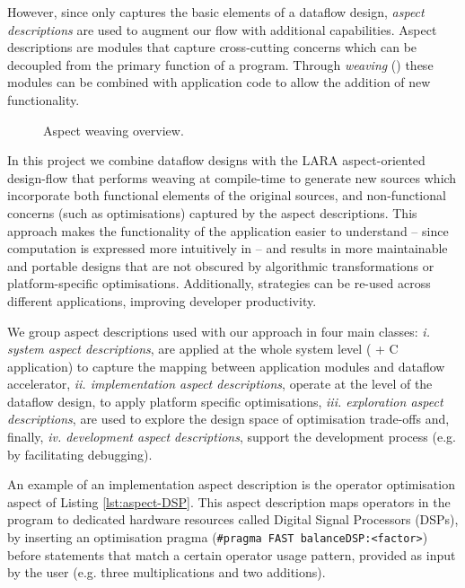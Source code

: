 \label{sec:aspects}

However, since \FAST{} only captures the basic elements of a dataflow
design, \emph{aspect descriptions} are used to augment our flow with
additional capabilities. Aspect descriptions are modules that capture
cross-cutting concerns which can be decoupled from the primary
function of a program. Through \emph{weaving}
() these modules can be combined with
application code to allow the addition of new functionality.


\begin{figure}[!ht]
  \centering
  \def\svgwidth{0.9\textwidth}
  
  \caption{Aspect weaving overview.}
  \label{fig:aspect-weaving}
\end{figure}

In this project we combine \FAST{} dataflow designs with the LARA
aspect-oriented design-flow
\cite{Cardoso:Carvalho:Cutinho:Luk:Nobre:Diniz:Petrov:2012} that
performs weaving at compile-time to generate new sources which
incorporate both functional elements of the original sources, and
non-functional concerns (such as optimisations) captured by the aspect
descriptions. This approach makes the functionality of the application
easier to understand -- since computation is expressed more
intuitively in \FAST{} -- and results in more maintainable and
portable designs that are not obscured by algorithmic transformations
or platform-specific optimisations. Additionally, strategies can be
re-used across different applications, improving developer
productivity.

We group aspect descriptions used with our approach in four main
classes: \emph{i. system aspect descriptions}, are applied at the
whole system level (\FAST{} + C application) to capture the mapping
between application modules and dataflow accelerator,
\emph{ii. implementation aspect descriptions}, operate at the level of
the dataflow design, to apply platform specific optimisations,
\emph{iii. exploration aspect descriptions}, are used to explore the
design space of optimisation trade-offs and, finally,
\emph{iv. development aspect descriptions}, support the development
process (e.g. by facilitating debugging).

An example of an implementation aspect description is the operator
optimisation aspect of Listing \ref{lst:aspect-DSP}. This aspect
description maps operators in the program to dedicated hardware
resources called Digital Signal Processors (DSPs), by inserting an
optimisation pragma (\texttt{\#pragma FAST balanceDSP:<factor>})
before statements that match a certain operator usage pattern,
provided as input by the user (e.g. three multiplications and two
additions).

